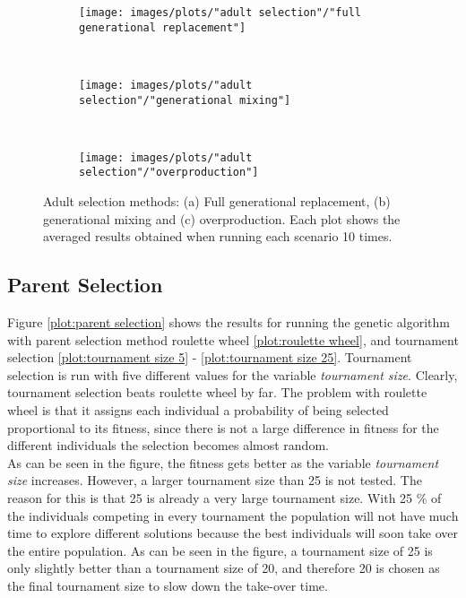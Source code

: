 \begin{figure}[h!]
    \centering
    \begin{subfigure}[b]{0.31\textwidth}
        \texttt{[image: images/plots/"adult selection"/"full generational replacement"]}
        \caption{}
        \hfill
        \label{plot:full generational replacement}
    \end{subfigure}
    ~
    \begin{subfigure}[b]{0.31\textwidth}
        \texttt{[image: images/plots/"adult selection"/"generational mixing"]}
        \caption{}
        \hfill
        \label{plot:generational mixing}
    \end{subfigure}
    ~
    \begin{subfigure}[b]{0.31\textwidth}
        \texttt{[image: images/plots/"adult selection"/"overproduction"]}
        \caption{}
        \hfill
        \label{plot:overproduction}
    \end{subfigure}
    \caption{Adult selection methods: (a) Full generational replacement, (b) generational mixing and (c) overproduction. Each plot shows the averaged results obtained when running each scenario 10 times.}
    \label{plot:adult selection methods}
\end{figure}


\subsection{Parent Selection}
Figure \ref{plot:parent selection} shows the results for running the genetic algorithm with parent selection method roulette wheel \ref{plot:roulette wheel}, and tournament selection \ref{plot:tournament size 5} - \ref{plot:tournament size 25}. Tournament selection is run with five different values for the variable \textit{tournament size}. Clearly, tournament selection beats roulette wheel by far. The problem with roulette wheel is that it assigns each individual a probability of being selected proportional to its fitness, since there is not a large difference in fitness for the different individuals the selection becomes almost random. \\


\noindent As can be seen in the figure, the fitness gets better as the variable \textit{tournament size} increases. However, a larger tournament size than 25 is not tested. The reason for this is that 25 is already a very large tournament size. With 25 \% of the individuals competing in every tournament the population will not have much time to explore different solutions because the best individuals will soon take over the entire population. As can be seen in the figure, a tournament size of 25 is only slightly better than a tournament size of 20, and therefore 20 is chosen as the final tournament size to slow down the take-over time. \\


